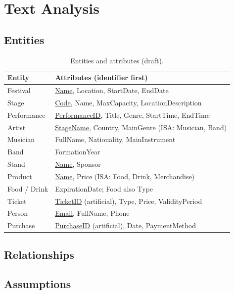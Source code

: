 \chapter{Text Analysis}

\section{Entities}

\begin{table}[H]\centering\small
\begin{tabularx}{\linewidth}{lX}
\toprule
Entity & Attributes (identifier first) \\
\midrule
Festival & \underline{Name}, Location, StartDate, EndDate \\
Stage & \underline{Code}, Name, MaxCapacity, LocationDescription \\
Performance & \underline{PerformanceID}, Title, Genre, StartTime, EndTime \\
Artist & \underline{StageName}, Country, MainGenre \quad (ISA: Musician, Band) \\
Musician & FullName, Nationality, MainInstrument \\
Band & FormationYear \\
Stand & \underline{Name}, Sponsor \\
Product & \underline{Name}, Price \quad (ISA: Food, Drink, Merchandise) \\
Food / Drink & ExpirationDate; Food also Type \\
Ticket & \underline{TicketID} (artificial), Type, Price, ValidityPeriod \\
Person & \underline{Email}, FullName, Phone \\
Purchase & \underline{PurchaseID} (artificial), Date, PaymentMethod \\
\bottomrule
\end{tabularx}
\caption{Entities and attributes (draft).}
\end{table}

\section{Relationships}

\section{Assumptions}
